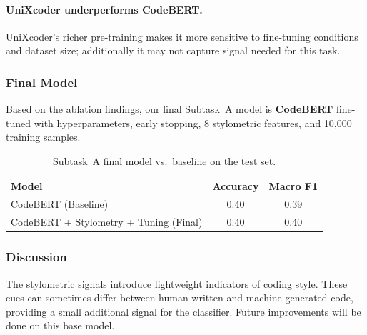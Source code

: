 \documentclass[11pt]{article}
\begin{document}
\paragraph{UniXcoder underperforms CodeBERT.}
UniXcoder's richer pre-training makes it more sensitive to fine-tuning conditions and dataset size; additionally it may not capture signal needed for this task.

\subsubsection{Final Model}

Based on the ablation findings, our final Subtask~A model is \textbf{CodeBERT} fine-tuned with hyperparameters, early stopping, 8 stylometric features, and 10,000 training samples.

\begin{table}[htbp]
\centering
\small
\begin{tabularx}{\columnwidth}{@{}X c c@{}}
\toprule
\textbf{Model} & \textbf{Accuracy} & \textbf{Macro F1} \\
\midrule
CodeBERT (Baseline) & 0.40 & 0.39 \\
CodeBERT + Stylometry + Tuning (Final) & 0.40 & 0.40 \\
\bottomrule
\end{tabularx}
\caption{Subtask~A final model vs.\ baseline on the test set.}
\label{tab:taskA_final}
\end{table}

\subsubsection{Discussion}
The stylometric signals introduce lightweight indicators of coding style. These cues can sometimes differ between human-written and machine-generated code, providing a small additional signal for the classifier. Future improvements will be done on this base model.


\end{document}
